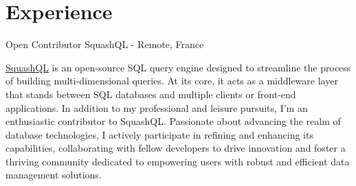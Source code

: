 \documentclass[]{friggeri-cv}
\begin{document}
\section{Experience}
\vspace{-3mm}
\begin{entrylist}
   \entry
    {Open Contributor}
    {SquashQL - Remote, France}
    {\href{https://www.squashql.io/}{SquashQL} is an open-source SQL query engine designed
     to streamline the process of building multi-dimensional queries. At its core, it acts as a middleware
     layer that stands between SQL databases and multiple clients or front-end applications. \newline
     In addition to my professional and leisure pursuits, I'm an enthusiastic contributor to SquashQL.
     Passionate about advancing the realm of database technologies, I actively participate in refining
     and enhancing its capabilities, collaborating with fellow developers to drive innovation and foster a
     thriving community dedicated to empowering users with robust and efficient data management solutions.

}
\end{entrylist}
\end{document}
